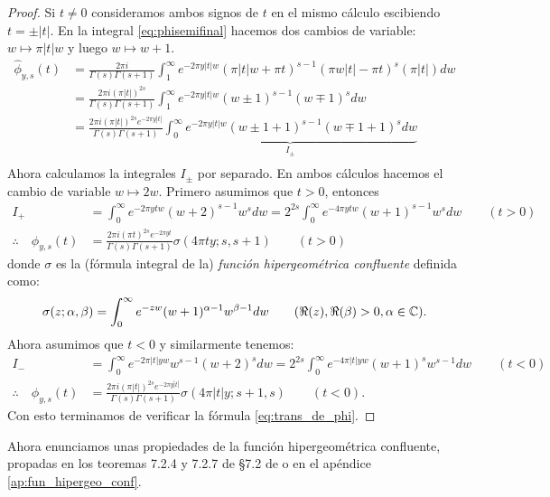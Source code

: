 \begin{proof}
Si $t\neq0$ consideramos ambos signos de $t$ en el mismo c\'alculo escibiendo $t=\pm|t|$. En la
integral \eqref{eq:phisemifinal} hacemos dos cambios de variable: $w\mapsto\pi |t| w$ y luego
$w\mapsto w+1$.
\begin{align}
  \hat{\phi}_{y,s}(t)&=
  \frac{2\pi i}{\Gamma(s)\Gamma(s+1)}
  \int_1^{\infty}e^{-2\pi y|t|w}(\pi|t|w+\pi t)^{s-1}(\pi w|t|-\pi t)^s(\pi |t|)dw\nonumber\\
  &=\frac{2\pi i(\pi |t|)^{2s}}{\Gamma(s)\Gamma(s+1)}
  \int_1^{\infty}e^{-2\pi y|t|w}(w\pm1)^{s-1}(w\mp 1)^sdw\nonumber\\
  &=\frac{2\pi i(\pi |t|)^{2s}e^{-2\pi y|t|}}{\Gamma(s)\Gamma(s+1)}
    \underset{I_{\pm}}{\underbrace{\int_0^{\infty}e^{-2\pi y|t|w}(w\pm1+1)^{s-1}(w\mp1+1)^sdw}}\nonumber\\
\end{align}
Ahora calculamos la integrales $I_{\pm}$ por separado. En ambos c\'alculos hacemos el cambio de
variable $w\mapsto 2w$. Primero asumimos que $t>0$, entonces
\begin{align*}
  I_+
  &=\int_0^{\infty}e^{-2\pi ytw}(w+2)^{s-1}w^sdw=2^{2s}\int_0^{\infty}e^{-4\pi ytw}(w+1)^{s-1}w^sdw
    \qquad(t>0)\\
  \therefore\quad\hat{\phi}_{y,s}(t)
  &=\frac{2\pi i(\pi t)^{2s}e^{-2\pi yt}}{\Gamma(s)\Gamma(s+1)}\sigma(4\pi ty;s,s+1)\qquad(t>0)
\end{align*}
donde $\sigma$ es la (f\'ormula integral de la) \emph{funci\'on hipergeom\'etrica confluente} definida
como:
\[
  \sigma(z;\alpha,\beta)=\int_0^{\infty}e^{-zw}(w+1)^{\alpha-1}w^{\beta-1}dw
  \qquad(\Re(z),\Re(\beta)>0,\alpha\in\mathbb{C}).
\]
Ahora asumimos que $t<0$ y similarmente tenemos:
\begin{align*}
  I_{-}
  &=\int_0^{\infty}e^{-2\pi|t|yw}w^{s-1}(w+2)^sdw=2^{2s}\int_0^{\infty}e^{-4\pi|t|yw}(w+1)^sw^{s-1}dw
    \qquad(t<0)\\
  \therefore\quad\hat{\phi}_{y,s}(t)
  &=\frac{2\pi i(\pi |t|)^{2s}e^{-2\pi y|t|}}{\Gamma(s)\Gamma(s+1)}\sigma(4\pi|t|y;s+1,s)\qquad(t<0).
\end{align*}
Con esto terminamos de verificar la f\'ormula \eqref{eq:trans_de_phi}.
\end{proof}

Ahora enunciamos unas propiedades de la funci\'on hipergeom\'etrica confluente, propadas en
los teoremas 7.2.4 y 7.2.7 de \S 7.2 de \cite{MiyakeMF} o en el ap\'endice
\ref{ap:fun_hipergeo_conf}.

